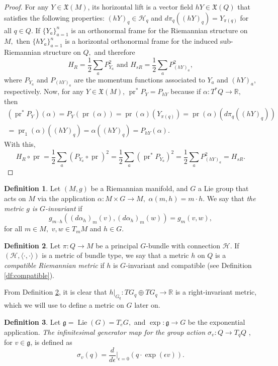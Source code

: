 \documentclass[12pt, letterpaper, reqno]{amsart}
\theoremstyle{definition}
\newtheorem{df}{Definition}
\theoremstyle{plain}
\theoremstyle{remark}
\begin{document}
\begin{proof}
	For any $ Y \in \mathfrak{X}(M) $, its horizontal lift is a vector field $ hY \in \mathfrak{X}(Q) $ that satisfies the following properties: $ (hY)_q \in \mathcal{H}_q $ and $ d\pi_q( (hY)_q) = Y_{\pi(q)}$ for all $ q\in Q. $  If $\{Y_a\}_{a=1}^n $ is an orthonormal frame for the Riemannian structure on $ M, $ then $ \{hY_a\}_{a=1}^n $ is a horizontal orthonormal frame for the induced sub-Riemannian structure on $ Q, $ and therefore
	$$ H_R = \frac{1}{2} \sum^{}_{a} P_{Y_a}^2 \text{ and } H_{sR} = \frac{1}{2} \sum^{}_{a} P_{(hY)_a}^2, $$ 
	where $ P_{Y_a} $ and $ P_{(hY)_a} $ are the momentum functions associated to $ Y_a $ and $ (hY)_a, $ respectively. Now, for any $ Y\in \mathfrak{X}(M) $, $ \operatorname{pr} ^* P_Y = P_{hY}$ because if $ \alpha: T^*Q \rightarrow \mathbb{R}, $ then
	\begin{align*}
	(\operatorname{pr}^*P_Y)(\alpha)=P_Y( \operatorname{pr} (\alpha)) = \operatorname{pr} (\alpha) (Y_{\pi(q)}) = \operatorname{pr} (\alpha) \left( d\pi_q((hY)_q) \right) \\= \operatorname{pr}_1(\alpha) \left( (hY)_q \right) =\alpha( (hY)_q ) =  P_{hY}(\alpha).  
	\end{align*}
	With this, 
	$$ H_R \circ \operatorname{pr} = \frac{1}{2} \sum^{}_{a} (P_{Y_a}\circ \operatorname{pr} )^2 = \frac{1}{2} \sum^{}_{a} (\operatorname{pr}^* P_{Y_a})^2 = \frac{1}{2} \sum^{}_{a} P_{(hY)_a}^2=H_{sR}. $$ 
\end{proof}
\begin{df}
	Let $ (M,g) $ be a Riemannian manifold, and $G $ a Lie group that acts on $ M $ via the application $ \alpha: M\times G \rightarrow M, $ $ \alpha(m,h)= m\cdot h. $ We say that \textit{the metric $ g $ is $ G $-invariant} if  
	$$ g_{m\cdot h}((d\alpha_h)_m(v),(d\alpha_h)_m(w))=g_m(v,w), $$ 
	for all $ m\in M, $ $ v,w\in T_mM $ and $ h\in G. $ 
\end{df}

\begin{df}\label{df:compatible_riemannian_metric}
	Let $ \pi: Q \rightarrow M $ be a principal $ G $-bundle with connection $ \mathcal{H}. $ If $ (\mathcal{H},\langle\cdot,\cdot\rangle) $ is a metric of bundle type, we say that a metric $ h $ on $ Q $ is a \textit{compatible Riemannian metric} if $ h $ is $ G $-invariant and compatible (see Definition \ref{df:compatible}).
\end{df}
 From Definition \ref{df:compatible_riemannian_metric}, it is clear that $ h|_{G_q}: TG_q \oplus TG_q \rightarrow \mathbb{R} $ is a right-invariant metric, which we will use to define a metric on $ G $ later on.
 \begin{df}
Let $ \mathfrak{g}= \operatorname{Lie}(G)=T_eG, $ and $ \operatorname{exp} : \mathfrak{g}\rightarrow G $ be the exponential application. \textit{The infinitesimal generator map for the group action $ \sigma_v: Q\rightarrow T_qQ $ }, for $ v \in \mathfrak{g} $,  is defined as
$$ \sigma_v(q) = \frac{d}{d\epsilon} \Big|_{\epsilon=0} \left( q\cdot \operatorname{exp} (\epsilon v) \right).$$ 
 \end{df}
\end{document}
